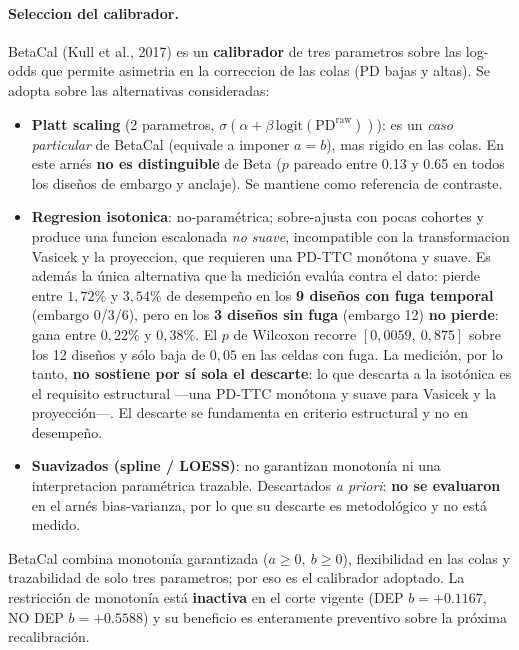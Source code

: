 \documentclass[12pt, a4paper]{article}
\newcommand{\PDraw}{\ensuremath{\mathrm{PD}^{\mathrm{raw}}}}
\newcommand{\logit}{\ensuremath{\mathrm{logit}}}
\begin{document}
\paragraph{Seleccion del calibrador.} BetaCal (Kull et al., 2017) es un \textbf{calibrador} de
tres parametros sobre las log-odds que permite asimetria en la correccion de las colas (PD bajas
y altas). Se adopta sobre las alternativas consideradas:
\begin{itemize}[nosep]
  \item \textbf{Platt scaling} (2 parametros, $\sigma(\alpha+\beta\,\logit(\PDraw))$): es un
    \emph{caso particular} de BetaCal (equivale a imponer $a=b$), mas rigido en las colas. En este
    arnés \textbf{no es distinguible} de Beta ($p$ pareado entre 0.13 y 0.65 en todos los diseños
    de embargo y anclaje). Se mantiene como referencia de contraste.
  \item \textbf{Regresion isotonica}: no-paramétrica; sobre-ajusta con pocas cohortes y produce
    una funcion escalonada \emph{no suave}, incompatible con la transformacion Vasicek y la
    proyeccion, que requieren una PD-TTC monótona y suave. Es además la única alternativa que la
    medición evalúa contra el dato: pierde entre $1{,}72\%$ y $3{,}54\%$ de desempeño en los
    \textbf{9 diseños con fuga temporal} (embargo 0/3/6), pero en los \textbf{3 diseños sin fuga}
    (embargo 12) \textbf{no pierde}: gana entre $0{,}22\%$ y $0{,}38\%$. El $p$ de Wilcoxon recorre
    $[0{,}0059,\ 0{,}875]$ sobre los 12 diseños y sólo baja de $0{,}05$ en las celdas con fuga. La
    medición, por lo tanto, \textbf{no sostiene por sí sola el descarte}: lo que descarta a la
    isotónica es el requisito estructural ---una PD-TTC monótona y suave para Vasicek y la
    proyección---. El descarte se fundamenta en criterio estructural y no en desempeño.
  \item \textbf{Suavizados (spline / LOESS)}: no garantizan monotonía ni una interpretacion
    paramétrica trazable. Descartados \emph{a priori}: \textbf{no se evaluaron} en el arnés
    bias-varianza, por lo que su descarte es metodológico y no está medido.
\end{itemize}
BetaCal combina monotonía garantizada ($a\ge0,\ b\ge0$), flexibilidad en las colas y trazabilidad
de solo tres parametros; por eso es el calibrador adoptado. La restricción de monotonía está
\textbf{inactiva} en el corte vigente (DEP $b=+0.1167$, NO DEP $b=+0.5588$) y su beneficio es
enteramente preventivo sobre la próxima recalibración.
\end{document}
